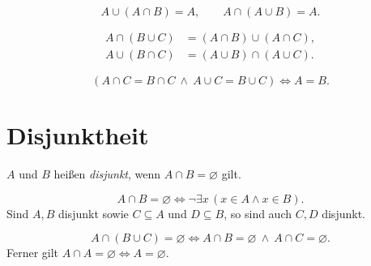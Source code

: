 \begin{theorem}[Absorptionsgesetze]
\[
 A\cup(A\cap B)=A,\qquad A\cap(A\cup B)=A.
\]
\end{theorem}

\begin{theorem}[Distributivgesetze]
\[
\begin{aligned}
 A\cap(B\cup C)&=(A\cap B)\cup(A\cap C),\\
 A\cup(B\cap C)&=(A\cup B)\cap(A\cup C).
\end{aligned}
\]
\end{theorem}

\begin{theorem}
\[
 (A\cap C=B\cap C\ \land\ A\cup C=B\cup C)
       \Longleftrightarrow A=B.
\]
\end{theorem}

\section{Disjunktheit}

\begin{definition}
$A$ und $B$ heißen \emph{disjunkt}, wenn
$A\cap B=\varnothing$ gilt.
\end{definition}

\begin{theorem}
\[
 A\cap B=\varnothing
     \Longleftrightarrow\neg\exists x\,(x\in A\land x\in B).
\]
Sind $A,B$ disjunkt sowie $C\subseteq A$ und $D\subseteq B$,
so sind auch $C,D$ disjunkt.
\end{theorem}

\begin{theorem}
\[
 A\cap(B\cup C)=\varnothing
 \Longleftrightarrow
 A\cap B=\varnothing\ \land\ A\cap C=\varnothing.
\]
Ferner gilt $A\cap A=\varnothing\Longleftrightarrow A=\varnothing$.
\end{theorem}
